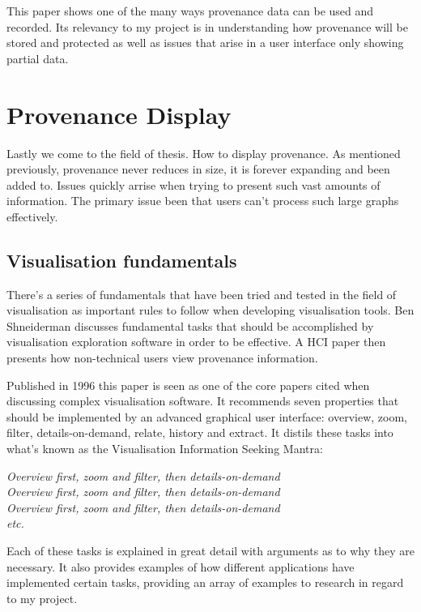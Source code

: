 This paper shows one of the many ways provenance data can be used and recorded. Its relevancy to my project is in understanding how provenance will be stored and protected as well as issues that arise in a user interface only showing partial data.

\section{Provenance Display}
\label{sec:provenance_display}

Lastly we come to the field of thesis. How to display provenance. As mentioned previously, provenance never reduces in size, it is forever expanding and been added to. Issues quickly arrise when trying to present such vast amounts of information. The primary issue been that users can't process such large graphs effectively.

\subsection{Visualisation fundamentals}
\label{sub:visualisation_fundamentals}

There's a series of fundamentals that have been tried and tested in the field of visualisation as important rules to follow when developing visualisation tools. Ben Shneiderman discusses fundamental tasks that should be accomplished by visualisation exploration software in order to be effective. A HCI paper then presents how non-technical users view provenance information.


Published in 1996 this paper is seen as one of the core papers cited when discussing complex visualisation software. It recommends seven properties that should be implemented by an advanced graphical user interface: overview, zoom, filter, details-on-demand, relate, history and extract. It distils these tasks into what's known as the Visualisation Information Seeking Mantra:

\textit{Overview first, zoom and filter, then details-on-demand}\\
\textit{Overview first, zoom and filter, then details-on-demand}\\
\textit{Overview first, zoom and filter, then details-on-demand}\\
\textit{etc.}

Each of these tasks is explained in great detail with arguments as to why they are necessary. It also provides examples of how different applications have implemented certain tasks, providing an array of examples to research in regard to my project.

